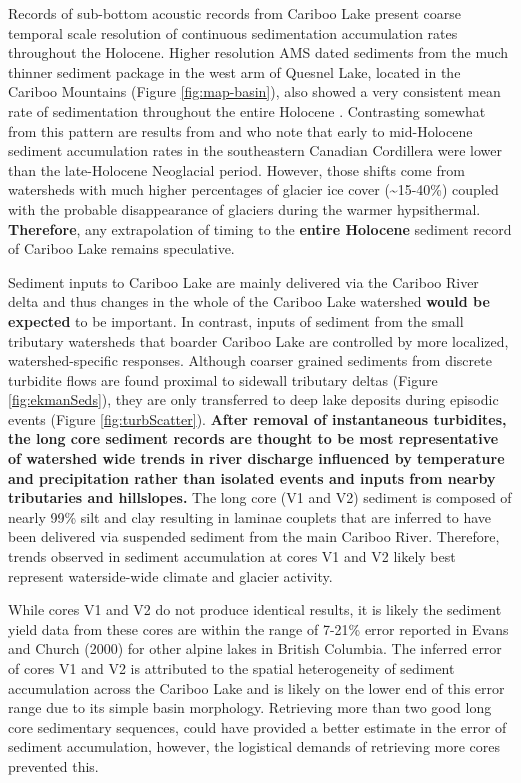 \documentclass[Royal,times,doublespace,sageh]{sagej}
\begin{document}
Records of sub-bottom acoustic records from Cariboo Lake present coarse
temporal scale resolution of continuous sedimentation accumulation rates
throughout the Holocene. Higher resolution AMS dated sediments from the
much thinner sediment package in the west arm of Quesnel Lake, located
in the Cariboo Mountains (Figure \ref{fig:map-basin}), also showed a
very consistent mean rate of sedimentation throughout the entire
Holocene \citep{Gilbert2012}. Contrasting somewhat from this pattern are
results from \citet{Menounos2004} and \citet{Desloges1999} who note that
early to mid-Holocene sediment accumulation rates in the southeastern
Canadian Cordillera were lower than the late-Holocene Neoglacial period.
However, those shifts come from watersheds with much higher percentages
of glacier ice cover (\textasciitilde15-40\%) coupled with the probable
disappearance of glaciers during the warmer hypsithermal.
\textbf{Therefore}, any extrapolation of timing to the \textbf{entire
Holocene} sediment record of Cariboo Lake remains speculative.

Sediment inputs to Cariboo Lake are mainly delivered via the Cariboo
River delta and thus changes in the whole of the Cariboo Lake watershed
\textbf{would be expected} to be important. In contrast, inputs of
sediment from the small tributary watersheds that boarder Cariboo Lake
are controlled by more localized, watershed-specific responses. Although
coarser grained sediments from discrete turbidite flows are found
proximal to sidewall tributary deltas (Figure \ref{fig:ekmanSeds}), they
are only transferred to deep lake deposits during episodic events
(Figure \ref{fig:turbScatter}). \textbf{After removal of instantaneous
turbidites, the long core sediment records are thought to be most
representative of watershed wide trends in river discharge influenced by
temperature and precipitation rather than isolated events and inputs
from nearby tributaries and hillslopes.} The long core (V1 and V2)
sediment is composed of nearly 99\% silt and clay resulting in laminae
couplets that are inferred to have been delivered via suspended sediment
from the main Cariboo River. Therefore, trends observed in sediment
accumulation at cores V1 and V2 likely best represent waterside-wide
climate and glacier activity.

While cores V1 and V2 do not produce identical results, it is likely the
sediment yield data from these cores are within the range of 7-21\%
error reported in Evans and Church (2000) for other alpine lakes in
British Columbia. The inferred error of cores V1 and V2 is attributed to
the spatial heterogeneity of sediment accumulation across the Cariboo
Lake and is likely on the lower end of this error range due to its
simple basin morphology. Retrieving more than two good long core
sedimentary sequences, could have provided a better estimate in the
error of sediment accumulation, however, the logistical demands of
retrieving more cores prevented this.
\end{document}

